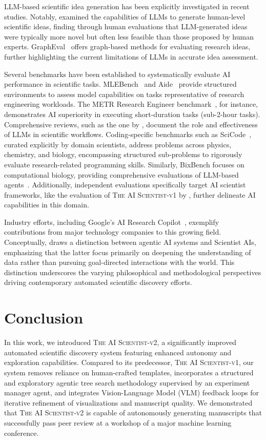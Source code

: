 \documentclass[11pt, a4paper]{include/gdm_format}
\newcommand{\oldalgo}{\textsc{The AI Scientist-v1}\xspace}
\newcommand{\ouralgo}{\textsc{The AI Scientist-v2}\xspace}
\begin{document}
LLM-based scientific idea generation has been explicitly investigated in recent studies. Notably, \citet{si2025can} examined the capabilities of LLMs to generate human-level scientific ideas, finding through human evaluations that LLM-generated ideas were typically more novel but often less feasible than those proposed by human experts. GraphEval~\citep{feng2025grapheval} offers graph-based methods for evaluating research ideas, further highlighting the current limitations of LLMs in accurate idea assessment.

Several benchmarks have been established to systematically evaluate AI performance in scientific tasks. MLEBench~\citep{chan2025mlebench} and Aide~\citep{aide2025} provide structured environments to assess model capabilities on tasks representative of research engineering workloads. The METR Research Engineer benchmark~\citep{Wijk2024REBenchEF}, for instance, demonstrates AI superiority in executing short-duration tasks (sub-2-hour tasks). Comprehensive reviews, such as the one by \citet{eger2025transforming}, document the role and effectiveness of LLMs in scientific workflows. Coding-specific benchmarks such as SciCode~\citep{tian2024scicode}, curated explicitly by domain scientists, address problems across physics, chemistry, and biology, encompassing structured sub-problems to rigorously evaluate research-related programming skills. Similarly, BixBench focuses on computational biology, providing comprehensive evaluations of LLM-based agents~\citep{mitchener2025bixbench}. Additionally, independent evaluations specifically target AI scientist frameworks, like the evaluation of \oldalgo by \citet{beel2025evaluation}, further delineate AI capabilities in this domain.

Industry efforts, including Google's AI Research Copilot~\citep[also known as AI Co-Scientist,][]{gottweis2025towards}, exemplify contributions from major technology companies to this growing field.
Conceptually, \citet{bengio2025superintelligentagentsposecatastrophic} draws a distinction between agentic AI systems and Scientist AIs, emphasizing that the latter focus primarily on deepening the understanding of data rather than pursuing goal-directed interactions with the world. This distinction underscores the varying philosophical and methodological perspectives driving contemporary automated scientific discovery efforts.

\section{Conclusion}
In this work, we introduced \ouralgo, a significantly improved automated scientific discovery system featuring enhanced autonomy and exploration capabilities. Compared to its predecessor, \oldalgo, our system removes reliance on human-crafted templates, incorporates a structured and exploratory agentic tree search methodology supervised by an experiment manager agent, and integrates Vision-Language Model (VLM) feedback loops for iterative refinement of visualizations and manuscript quality. We demonstrated that \ouralgo is capable of autonomously generating manuscripts that successfully pass peer review at a workshop of a major machine learning conference.
\end{document}

